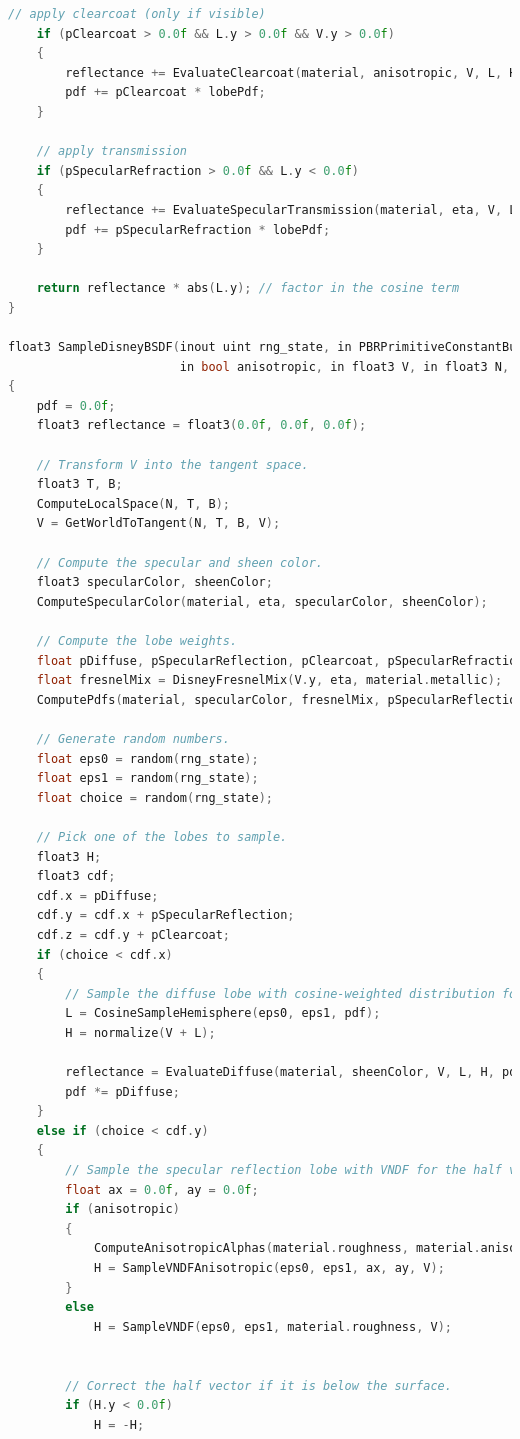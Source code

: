 \documentclass[12pt,a4paper]{report}
\numberwithin{equation}{section} %
\begin{document}
\begin{appendices}
\begin{lstlisting}[caption={Evaluarea și eșantionarea BSDF-ului Disney},label={lst:bsdf},language=C++,escapechar=\$]
	// apply clearcoat (only if visible)
	if (pClearcoat > 0.0f && L.y > 0.0f && V.y > 0.0f)
	{
		reflectance += EvaluateClearcoat(material, anisotropic, V, L, H, lobePdf);
		pdf += pClearcoat * lobePdf;
	}

	// apply transmission
	if (pSpecularRefraction > 0.0f && L.y < 0.0f)
	{
		reflectance += EvaluateSpecularTransmission(material, eta, V, L, H, anisotropic, ax, ay, lobePdf);
		pdf += pSpecularRefraction * lobePdf;
	}

	return reflectance * abs(L.y); // factor in the cosine term
}

float3 SampleDisneyBSDF(inout uint rng_state, in PBRPrimitiveConstantBuffer material, in float eta,
						in bool anisotropic, in float3 V, in float3 N, out float3 L, out float pdf)
{
	pdf = 0.0f;
	float3 reflectance = float3(0.0f, 0.0f, 0.0f);

	// Transform V into the tangent space.
	float3 T, B;
	ComputeLocalSpace(N, T, B);
	V = GetWorldToTangent(N, T, B, V);

	// Compute the specular and sheen color.
	float3 specularColor, sheenColor;
	ComputeSpecularColor(material, eta, specularColor, sheenColor);

	// Compute the lobe weights.
	float pDiffuse, pSpecularReflection, pClearcoat, pSpecularRefraction;
	float fresnelMix = DisneyFresnelMix(V.y, eta, material.metallic);
	ComputePdfs(material, specularColor, fresnelMix, pSpecularReflection, pDiffuse, pClearcoat, pSpecularRefraction);

	// Generate random numbers.
	float eps0 = random(rng_state);
	float eps1 = random(rng_state);
	float choice = random(rng_state);

	// Pick one of the lobes to sample.
	float3 H;
	float3 cdf;
	cdf.x = pDiffuse;
	cdf.y = cdf.x + pSpecularReflection;
	cdf.z = cdf.y + pClearcoat;
	if (choice < cdf.x)
	{
		// Sample the diffuse lobe with cosine-weighted distribution for outgoing direction.
		L = CosineSampleHemisphere(eps0, eps1, pdf);
		H = normalize(V + L);

		reflectance = EvaluateDiffuse(material, sheenColor, V, L, H, pdf);
		pdf *= pDiffuse;
	}
	else if (choice < cdf.y)
	{
		// Sample the specular reflection lobe with VNDF for the half vector.
		float ax = 0.0f, ay = 0.0f;
		if (anisotropic)
		{
			ComputeAnisotropicAlphas(material.roughness, material.anisotropic, ax, ay);
			H = SampleVNDFAnisotropic(eps0, eps1, ax, ay, V);
		}
		else
			H = SampleVNDF(eps0, eps1, material.roughness, V);
		

		// Correct the half vector if it is below the surface.
		if (H.y < 0.0f)
			H = -H;


\end{lstlisting}
\end{appendices}
\end{document}
